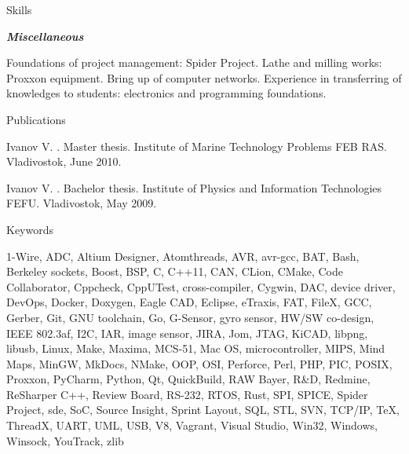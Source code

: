 \documentclass{template}
\begin{document}
\begin{rSection}{Skills}
\begin{rItemize}
\item \textbf{\textit{Miscellaneous}}

      Foundations of project management: Spider Project. Lathe and milling works: Proxxon equipment. Bring up of computer networks. Experience in
      transferring of knowledges to students: electronics and programming foundations.

\end{rItemize}
\end{rSection}


\begin{rSection}{Publications}
\begin{rItemize}

\item Ivanov V. . Master thesis. \newline
      Institute of Marine Technology Problems FEB RAS. Vladivostok, June 2010.
\item Ivanov V. . Bachelor thesis. \newline
      Institute of Physics and Information Technologies FEFU. Vladivostok, May 2009.

\end{rItemize}
\end{rSection}


\begin{rSection}{Keywords}

1-Wire, ADC, Altium Designer, Atomthreads, AVR, avr-gcc, BAT, Bash, Berkeley sockets, Boost, BSP, C, C++11, CAN, CLion, CMake, Code Collaborator,
Cppcheck, CppUTest, cross-compiler, Cygwin, DAC, device driver, DevOps, Docker, Doxygen, Eagle CAD, Eclipse, eTraxis, FAT, FileX, GCC, Gerber,
Git, GNU toolchain, Go, G-Sensor, gyro sensor, HW/SW co-design, IEEE 802.3af, I2C, IAR, image sensor, JIRA, Jom, JTAG, KiCAD, libpng, libusb,
Linux, Make, Maxima, MCS-51, Mac OS, microcontroller, MIPS, Mind Maps, MinGW, MkDocs, NMake, OOP, OSI, Perforce, Perl, PHP, PIC, POSIX, Proxxon,
PyCharm, Python, Qt, QuickBuild, RAW Bayer, R\&D, Redmine, ReSharper C++, Review Board, RS-232, RTOS, Rust, SPI, SPICE, Spider Project, sde, SoC,
Source Insight, Sprint Layout, SQL, STL, SVN, TCP/IP, \TeX, ThreadX, UART, UML, USB, V8, Vagrant, Visual Studio, Win32, Windows, Winsock, YouTrack,
zlib

\end{rSection}
\end{document}
